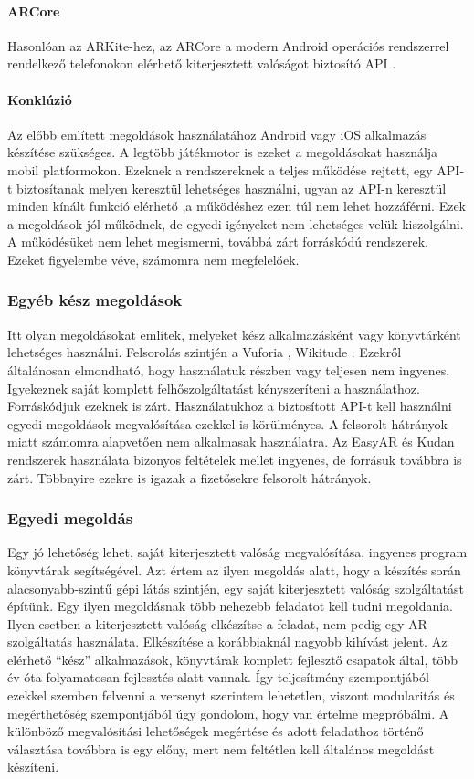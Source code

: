 \documentclass[12pt,a4paper,oneside]{report} %
\begin{document}
\paragraph{ARCore}
Hasonlóan az ARKite-hez, az ARCore a modern Android operációs rendszerrel rendelkező telefonokon elérhető kiterjesztett valóságot biztosító API \cite{arcore}.
\paragraph{Konklúzió}
Az előbb említett megoldások használatához Android vagy iOS alkalmazás készítése szükséges. A legtöbb játékmotor is ezeket a megoldásokat használja mobil platformokon. Ezeknek a rendszereknek a teljes működése rejtett, egy API-t biztosítanak melyen keresztül lehetséges használni, ugyan az API-n keresztül minden kínált funkció elérhető ,a működéshez ezen túl nem lehet hozzáférni. Ezek a megoldások jól működnek, de egyedi igényeket nem lehetséges velük kiszolgálni. A működésüket nem lehet megismerni, továbbá zárt forráskódú rendszerek. Ezeket figyelembe véve, számomra nem megfelelőek.
\subsubsection{Egyéb kész megoldások}
Itt olyan megoldásokat említek, melyeket kész alkalmazásként vagy könyvtárként lehetséges használni. Felsorolás szintjén a Vuforia \cite{vuforia}, Wikitude \cite{wikitude}.
Ezekről általánosan elmondható, hogy használatuk részben vagy teljesen nem ingyenes. Igyekeznek saját komplett felhőszolgáltatást kényszeríteni a használathoz. Forráskódjuk ezeknek is zárt. Használatukhoz a biztosított API-t kell használni egyedi megoldások megvalósítása ezekkel is körülményes.  A felsorolt hátrányok miatt számomra alapvetően nem alkalmasak használatra.
Az EasyAR \cite{ezar} és Kudan \cite{kudan} rendszerek használata bizonyos feltételek mellet ingyenes, de forrásuk továbbra is zárt. Többnyire ezekre is igazak a  fizetősekre felsorolt hátrányok.

\subsubsection{Egyedi megoldás}
Egy jó lehetőség lehet, saját kiterjesztett valóság megvalósítása, ingyenes program könyvtárak segítségével.
Azt értem az ilyen megoldás alatt, hogy a készítés során alacsonyabb-szintű gépi látás szintjén, egy saját kiterjesztett valóság szolgáltatást építünk. Egy ilyen megoldásnak több nehezebb feladatot kell tudni megoldania. Ilyen esetben a kiterjesztett valóság elkészítse a feladat, nem pedig egy AR szolgáltatás használata. Elkészítése a korábbiaknál nagyobb kihívást jelent. Az elérhető ``kész'' alkalmazások, könyvtárak komplett fejlesztő csapatok által, több év óta folyamatosan fejlesztés alatt vannak. Így teljesítmény szempontjából ezekkel szemben felvenni a versenyt szerintem lehetetlen, viszont modularitás és megérthetőség szempontjából úgy gondolom, hogy van értelme megpróbálni. A különböző megvalósítási lehetőségek megértése és adott feladathoz történő választása továbbra is egy előny, mert nem feltétlen kell általános megoldást készíteni.
\end{document}
